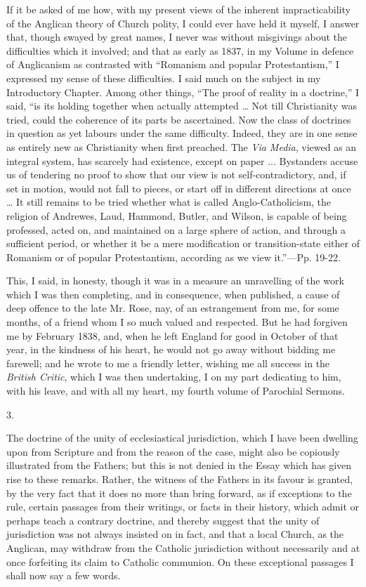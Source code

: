 If it be asked of me how, with my present views of the inherent
impracticability of the Anglican theory of Church polity, I could ever
have held it myself, I answer that, though swayed by great names, I
never was without misgivings about the difficulties which it involved;
and that as early as 1837, in my Volume in defence of Anglicanism as
contrasted with ``Romanism and popular Protestantism,'' I
expressed my sense of these difficulties. I said much on the subject
in my Introductory Chapter. Among other things, ``The proof of
reality in a doctrine,'' I said, ``is its holding together
when actually attempted … Not till Christianity was tried, could the
coherence of its parts be ascertained. Now the class of doctrines in
question as yet labours under the same difficulty. Indeed, they are in
one sense as entirely new as Christianity when first preached. The \emph{Via
Media}, viewed as an integral system, has scarcely had existence,
except on paper ... Bystanders accuse us of tendering no proof to show
that our view is not self-contradictory, and, if set in motion, would
not fall to pieces, or start off in different directions at once …
It still remains to be tried whether what is called Anglo-Catholicism,
the religion of Andrewes, Laud, Hammond, Butler, and Wilson, is
capable of being professed, acted on, and maintained on a large sphere
of action, and through a sufficient period, or whether it be a mere
modification or transition-state either of Romanism or of popular
Protestantism, according as we view it.''—Pp. 19-22.

This, I said, in honesty, though it was in a measure an unravelling
of the work which I was then completing, and in consequence,
when published, a cause of deep offence to the late Mr. Rose, nay, of
an estrangement from me, for some months, of a friend whom I so much
valued and respected. But he had forgiven me by February 1838, and,
when he left England for good in October of that year, in the kindness
of his heart, he would not go away without bidding me farewell; and he
wrote to me a friendly letter, wishing me all success in the \emph{British
Critic}, which I was then undertaking, I on my part dedicating to
him, with his leave, and with all my heart, my fourth volume of
Parochial Sermons.

3.

The doctrine of the unity of ecclesiastical jurisdiction, which I
have been dwelling upon from Scripture and from the reason of the
case, might also be copiously illustrated from the Fathers; but this
is not denied in the Essay which has given rise to these remarks.
Rather, the witness of the Fathers in its favour is granted, by the
very fact that it does no more than bring forward, as if exceptions to
the rule, certain passages from their writings, or facts in their
history, which admit or perhaps teach a contrary doctrine, and thereby
suggest that the unity of jurisdiction was not always insisted on in
fact, and that a local Church, as the Anglican, may withdraw from the
Catholic jurisdiction without necessarily and at once forfeiting its
claim to Catholic communion. On these exceptional passages I shall now
say a few words.

